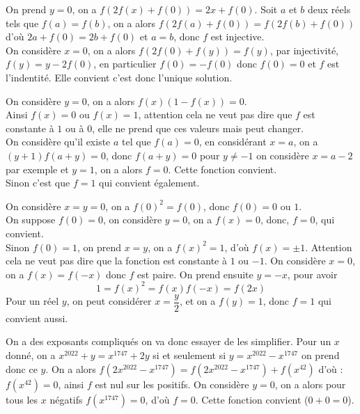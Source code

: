 \begin{sol}[][2]
On prend $y=0$, on a $f(2f(x)+f(0))=2x+f(0)$. Soit $a$ et $b$ deux réels tels que $f(a)=f(b)$, on a alors $f(2f(a)+f(0))=f(2f(b)+f(0))$ d'où $2a+f(0)=2b+f(0)$ et $a=b$, donc $f$ est injective.\\
On considère $x=0$, on a alors $f(2f(0)+f(y))=f(y)$, par injectivité, $f(y)=y-2f(0)$, en particulier $f(0)=-f(0)$ donc $f(0)=0$ et $f$ est l'indentité. Elle convient c'est donc l'unique solution.
\end{sol}
\begin{sol}[][3]
On considère $y=0$, on a alors $f(x)(1-f(x))=0$.\\
Ainsi $f(x)=0$ ou $f(x)=1$, attention cela ne veut pas dire que $f$ est constante à $1$ ou à $0$, elle ne prend que ces valeurs mais peut changer.\\
On considère qu'il existe $a$ tel que $f(a)=0$, en considérant $x=a$, on a $(y+1)f(a+y)=0$, donc $f(a+y)=0$ pour $y\ne-1$ on considère $x=a-2$ par exemple et $y=1$, on a alors $f=0$. Cette fonction convient. \\
Sinon c'est que $f=1$ qui convient également.
\end{sol}
\begin{sol}[][4]
On considère $x=y=0$, on a $f(0)^2=f(0)$, donc $f(0)=0$ ou $1$.\\
On suppose $f(0)=0$, on considère $y=0$, on a $f(x)=0$, donc, $f=0$, qui convient.\\
Sinon $f(0)=1$, on prend $x=y$, on a $f(x)^2=1$, d'où $f(x)=\pm1$. Attention cela ne veut pas dire que la fonction est constante à $1$ ou $-1$. On considère $x=0$, on a $f(x)=f(-x)$ donc $f$ est paire. On prend ensuite $y=-x$, pour avoir $$1=f(x)^2=f(x)f(-x)=f(2x)$$
Pour un réel $y$, on peut considérer $x=\dfrac y2$, et on a $f(y)=1$, donc $f=1$ qui convient aussi.
\end{sol}
\begin{sol}[][5]
On a des exposants compliqués on va donc essayer de les simplifier. Pour un $x$ donné, on a $x^{2022}+y=x^{1747}+2y$ si et seulement si $y=x^{2022}-x^{1747}$ on prend donc ce $y$. On a alors $f(2x^{2022}-x^{1747})=f(2x^{2022}-x^{1747})+f(x^{42})$ d'où : $f(x^{42})=0$, ainsi $f$ est nul sur les positifs. On considère $y=0$, on a alors pour tous les $x$ négatifs $f(x^{1747})=0$, d'où $f=0$. Cette fonction convient ($0+0=0$).
\end{sol}
